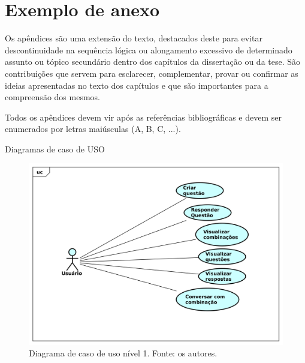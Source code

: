 \chapter{Exemplo de anexo}


Os apêndices são uma extensão do texto, destacados deste para evitar descontinuidade na sequência lógica ou alongamento excessivo de determinado assunto ou tópico secundário dentro dos capítulos da dissertação ou da tese. São contribuições que servem para esclarecer, complementar, provar ou confirmar as ideias apresentadas no texto dos capítulos e que são importantes para a compreensão dos mesmos.

Todos os apêndices devem vir após as referências bibliográficas e devem ser enumerados por letras maiúsculas (A, B, C, ...).



Diagramas de caso de USO
\begin{figure}[!htb]
\centering
\includegraphics[width=16cm]{DCU1.png}
\caption{Diagrama de caso de uso nível 1. Fonte: os autores.}
\label{fig:DCU1}
\end{figure}

